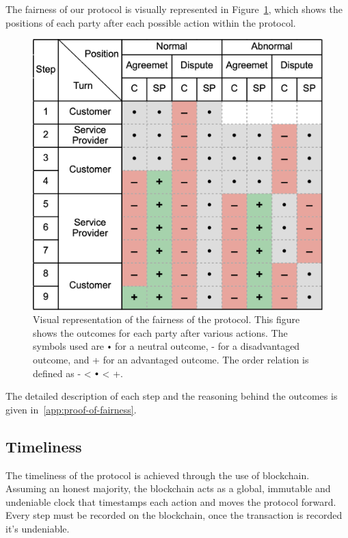 \documentclass[pdftex,twocolumn,epjc3]{svjour3}
\newcommand{\plus}{+}
\newcommand{\minus}{-}
\newcommand\neutral[1][.75]{\mathbin{\ThisStyle{\vcenter{\hbox{%
  \scalebox{#1}{$\SavedStyle\bullet$}}}}}%
}
\begin{document}
The fairness of our protocol is visually represented in Figure~\ref{fig:positions}, which shows the positions of each party after each possible action within the protocol.

\begin{figure}[h!]
\includegraphics[width=\linewidth]{model.png}
\centering
\caption{Visual representation of the fairness of the protocol. This figure shows the outcomes for each party after various actions. The symbols used are $\neutral{}$ for a neutral outcome, \minus{} for a disadvantaged outcome, and \plus{} for an advantaged outcome. The order relation is defined as \minus{} < $\neutral{}$ < \plus{}.}
\label{fig:positions}
\end{figure}

The detailed description of each step and the reasoning behind the outcomes is given in~\ref{app:proof-of-fairness}.



\subsection{Timeliness}
The timeliness of the protocol is achieved through the use of blockchain. Assuming an honest majority, the blockchain acts as a global, immutable and undeniable clock that timestamps each action and moves the protocol forward. Every step must be recorded on the blockchain, once the transaction is recorded it's undeniable.
\end{document}
